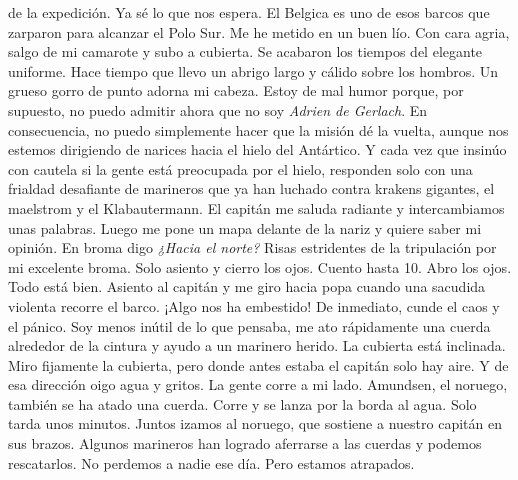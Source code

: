 \documentclass{article}
\begin{document}
    de
    la expedición. Ya sé lo que nos espera. El Belgica es uno de esos barcos que zarparon para alcanzar el Polo Sur.
    Me he metido en un buen lío. Con cara agria, salgo de mi camarote y subo a cubierta. Se acabaron los tiempos del
    elegante uniforme. Hace tiempo que llevo un abrigo largo y cálido sobre los hombros. Un grueso gorro de punto
    adorna mi cabeza. Estoy de mal humor porque, por supuesto, no puedo admitir ahora que no soy \textit{Adrien de
      Gerlach}. En consecuencia, no puedo simplemente hacer que la misión dé la vuelta, aunque nos estemos
    dirigiendo de narices hacia el hielo del Antártico. Y cada vez que insinúo con cautela si la gente está
    preocupada
    por el hielo, responden solo con una frialdad desafiante de marineros que ya han luchado contra krakens
    gigantes,
    el maelstrom y el Klabautermann. El capitán me saluda radiante y intercambiamos unas palabras. Luego me pone un
    mapa delante de la nariz y quiere saber mi opinión. En broma digo \textit{¿Hacia el norte?} Risas estridentes de
    la
    tripulación por mi excelente broma. Solo asiento y cierro los ojos. Cuento hasta 10. Abro los ojos. Todo está
    bien. Asiento al capitán y me giro hacia popa cuando una sacudida violenta recorre el barco. ¡Algo nos ha
    embestido! De inmediato, cunde el caos y el pánico. Soy menos inútil de lo que pensaba, me ato rápidamente una
    cuerda alrededor de la cintura y ayudo a un marinero herido. La cubierta está inclinada. Miro fijamente la
    cubierta, pero donde antes estaba el capitán solo hay aire. Y de esa dirección oigo agua y gritos. La gente
    corre
    a mi lado. Amundsen, el noruego, también se ha atado una cuerda. Corre y se lanza por la borda al agua. Solo
    tarda
    unos minutos. Juntos izamos al noruego, que sostiene a nuestro capitán en sus brazos. Algunos marineros han
    logrado aferrarse a las cuerdas y podemos rescatarlos. No perdemos a nadie ese día. Pero estamos atrapados.\\
\end{document}
